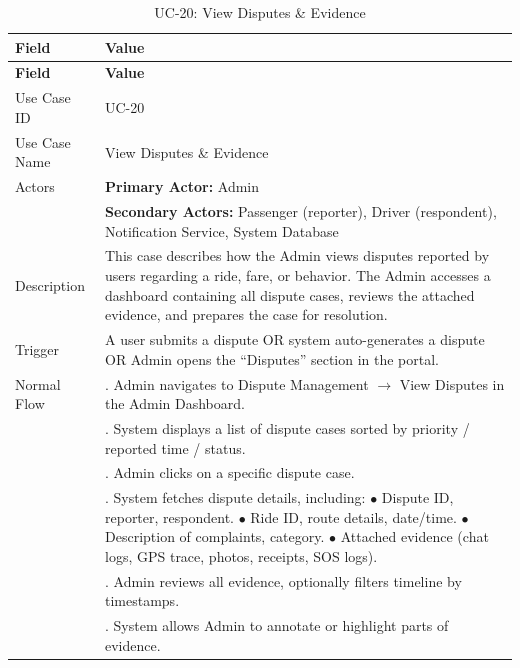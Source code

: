 \begin{longtable}{|>{\raggedright\arraybackslash}p{4cm}|>{\raggedright\arraybackslash}p{11cm}|}
\caption{UC-20: View Disputes \& Evidence}
\label{tab:uc-20} \\
\hline
\rowcolor{lightgray!30}
\textbf{Field} & \textbf{Value} \\
\hline
\endfirsthead
\hline
\rowcolor{lightgray!30}
\textbf{Field} & \textbf{Value} \\
\hline
\endhead
\hline
\endfoot
\hline
\endlastfoot
Use Case ID & UC-20 \\
\hline
Use Case Name & View Disputes \& Evidence \\
\hline
Actors & \textbf{Primary Actor:} Admin \\
& \textbf{Secondary Actors:} Passenger (reporter), Driver (respondent), Notification Service, System Database \\
\hline
Description & This case describes how the Admin views disputes reported by users regarding a ride, fare, or behavior. The Admin accesses a dashboard containing all dispute cases, reviews the attached evidence, and prepares the case for resolution. \\
\hline
Trigger & A user submits a dispute OR system auto-generates a dispute OR Admin opens the ``Disputes'' section in the portal. \\
\hline
Normal Flow & 1. Admin navigates to Dispute Management $\rightarrow$ View Disputes in the Admin Dashboard. \\
& 2. System displays a list of dispute cases sorted by priority / reported time / status. \\
& 3. Admin clicks on a specific dispute case. \\
& 4. System fetches dispute details, including: \newline $\bullet$ Dispute ID, reporter, respondent. \newline $\bullet$ Ride ID, route details, date/time. \newline $\bullet$ Description of complaints, category. \newline $\bullet$ Attached evidence (chat logs, GPS trace, photos, receipts, SOS logs). \\
& 5. Admin reviews all evidence, optionally filters timeline by timestamps. \\
& 6. System allows Admin to annotate or highlight parts of evidence. \\

\end{longtable}

